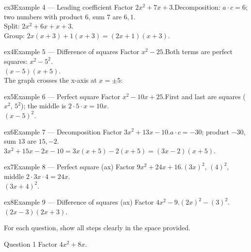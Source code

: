 \documentclass[11pt]{article}
\begin{document}
\begin{example}{ex3}{Example 4 --- Leading coefficient}
Factor $2x^2+7x+3$.\soln Decomposition: $a\cdot c=6$; two numbers with product $6$, sum $7$ are $6,1$. \\ Split: $2x^2+6x+x+3$. \\ Group: $2x(x+3)+1(x+3)=(2x+1)(x+3)$.
\end{example}

\begin{example}{ex4}{Example 5 --- Difference of squares}
Factor $x^2-25$.\soln Both terms are perfect squares: $x^2-5^2$. \\ $(x-5)(x+5)$. \\ The graph crosses the x-axis at $x=\pm5$:
\end{example}

\begin{example}{ex5}{Example 6 --- Perfect square}
Factor $x^2-10x+25$.\soln First and last are squares ($x^2$, $5^2$); the middle is $2\cdot5\cdot x=10x$. \\ $(x-5)^2$.
\end{example}

\begin{example}{ex6}{Example 7 --- Decomposition}
Factor $3x^2+13x-10$.\soln $a\cdot c=-30$; product $-30$, sum $13$ are $15,-2$. \\ $3x^2+15x-2x-10=3x(x+5)-2(x+5)=(3x-2)(x+5)$.
\end{example}

\begin{example}{ex7}{Example 8 --- Perfect square (ax)}
Factor $9x^2+24x+16$.\soln $(3x)^2$, $(4)^2$, middle $2\cdot3x\cdot4=24x$. \\ $(3x+4)^2$.
\end{example}

\begin{example}{ex8}{Example 9 --- Difference of squares (ax)}
Factor $4x^2-9$.\soln $(2x)^2-(3)^2$. \\ $(2x-3)(2x+3)$.
\end{example}

\clearpage
{}
For each question, show all steps clearly in the space provided.

\begin{qbox}{Question 1}
Factor $4x^2+8x$.\workspace{2.4cm}
\end{qbox}
\end{document}
